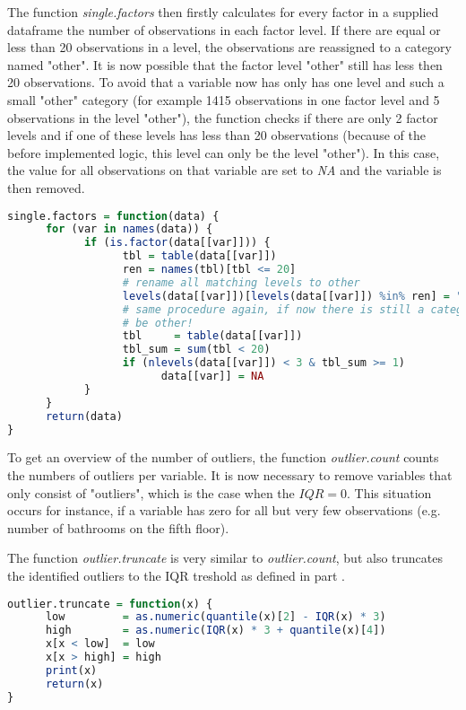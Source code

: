 The function \textit{single.factors} then firstly calculates for every factor in a supplied dataframe the number of observations in each factor level. If there are equal or less than 20 observations in a level, the observations are reassigned to a category named "other". 
It is now possible that the factor level "other" still has less then 20 observations. To avoid that a variable now has only has one level and such a small "other" category (for example 1415 observations in one  factor level and 5 observations in the level "other"), the function  checks if there are only 2 factor levels and if one of these levels has less than 20 observations (because of the before implemented logic, this level can only be the level "other"). In this case, the value for all observations on that variable are set to \textit{NA} and the variable is then removed.

\begin{lstlisting}[language=R]
single.factors = function(data) {
      for (var in names(data)) {
            if (is.factor(data[[var]])) {
                  tbl = table(data[[var]])
                  ren = names(tbl)[tbl <= 20]
                  # rename all matching levels to other
                  levels(data[[var]])[levels(data[[var]]) %in% ren] = "Other"
                  # same procedure again, if now there is still a category with less than 20 it can only
                  # be other!
                  tbl     = table(data[[var]])
                  tbl_sum = sum(tbl < 20)
                  if (nlevels(data[[var]]) < 3 & tbl_sum >= 1) 
                        data[[var]] = NA
            }
      }
      return(data)
}
\end{lstlisting}


To get an overview of the number of outliers, the function \textit{outlier.count}  counts the numbers of outliers per variable.
It is now necessary to remove variables that only consist of "outliers", which is the case when the $IQR=0$. This situation occurs for instance, if a variable has zero for all but very few observations (e.g. number of bathrooms on the fifth floor). 

The function \textit{outlier.truncate} is very similar to \textit{outlier.count}, but also truncates the identified outliers to the IQR treshold as defined in part . 

\begin{lstlisting}[language=R]
outlier.truncate = function(x) {
      low         = as.numeric(quantile(x)[2] - IQR(x) * 3)
      high        = as.numeric(IQR(x) * 3 + quantile(x)[4])
      x[x < low]  = low
      x[x > high] = high
      print(x)
      return(x)
}
\end{lstlisting}


